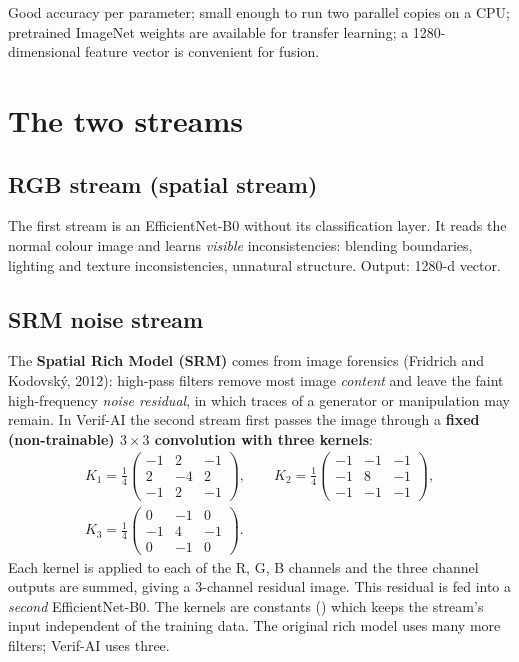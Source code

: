 \documentclass[11pt,a4paper]{report}
\newcommand{\code}[1]{\texttt{\detokenize{#1}}}
\begin{document}
\begin{keybox}
Good accuracy per parameter; small enough to run two parallel copies on a CPU; pretrained ImageNet weights are available for transfer learning; a 1280-dimensional feature vector is convenient for fusion.
\end{keybox}

\section{The two streams}
\subsection{RGB stream (spatial stream)}
The first stream is an EfficientNet-B0 without its classification layer. It reads the normal colour image and learns \emph{visible} inconsistencies: blending boundaries, lighting and texture inconsistencies, unnatural structure. Output: 1280-d vector.

\subsection{SRM noise stream}
The \textbf{Spatial Rich Model (SRM)} comes from image forensics (Fridrich and Kodovsk\'y, 2012): high-pass filters remove most image \emph{content} and leave the faint high-frequency \emph{noise residual}, in which traces of a generator or manipulation may remain.
In Verif-AI the second stream first passes the image through a \textbf{fixed (non-trainable) $3\times3$ convolution with three kernels}:
\begin{gather*}
K_1=\tfrac14\begin{pmatrix}-1&2&-1\\2&-4&2\\-1&2&-1\end{pmatrix},\qquad
K_2=\tfrac14\begin{pmatrix}-1&-1&-1\\-1&8&-1\\-1&-1&-1\end{pmatrix},\\[2pt]
K_3=\tfrac14\begin{pmatrix}0&-1&0\\-1&4&-1\\0&-1&0\end{pmatrix}.
\end{gather*}
Each kernel is applied to each of the R, G, B channels and the three channel outputs are summed, giving a 3-channel residual image. This residual is fed into a \emph{second} EfficientNet-B0. The kernels are constants (\code{requires_grad=False}) which keeps the stream's input independent of the training data.
The original rich model uses many more filters; Verif-AI uses three.
\end{document}
